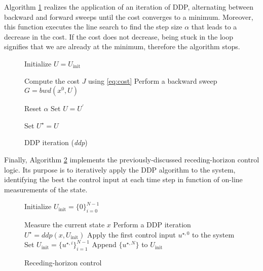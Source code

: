 Algorithm \ref{alg:ddp} realizes the application of an iteration of DDP, alternating between backward and forward sweeps until the cost converges to a minimum. Moreover, this function executes the line search to find the step size $\alpha$ that leads to a decrease in the cost. If the cost does not decrease, being stuck in the loop signifies that we are already at the minimum, therefore the algorithm stops.

\begin{figure}[H]
    \centering
    \begin{algorithm}[H]
        \caption{DDP iteration (\textit{ddp})}
        \label{alg:ddp}
        Initialize $U = U_{\text{init}}$\;
    
         {
            Compute the cost $J$ using \ref{eq:cost}\;
            Perform a backward sweep $G = \textit{bwd}(x^0, U)$\;
    
            Reset $\alpha$\;
            Set $U = U^\prime$\;
        }
        Set $U^\star = U$\;
    \end{algorithm}
\end{figure}

Finally, Algorithm \ref{alg:rh} implements the previously-discussed receding-horizon control logic. Its purpose is to iteratively apply the DDP algorithm to the system, identifying the best the control input at each time step in function of on-line measurements of the state.

\begin{figure}[H]
    \centering
    \begin{algorithm}[H]
        \caption{Receding-horizon control}
        \label{alg:rh}
        Initialize $U_{\text{init}} = \{0\}_{i=0}^{N-1}$\;

         {
            Measure the current state $x$\;
            Perform a DDP iteration $U^\star = \textit{ddp}(x, U_{\text{init}})$\;
            Apply the first control input $u^{\star,0}$ to the system\;
            Set $U_{\text{init}} = \{u^{\star,i}\}_{i=1}^{N-1}$\;
            Append $\{u^{\star,N}\}$ to $U_{\text{init}}$\;
        }
    \end{algorithm}
\end{figure}